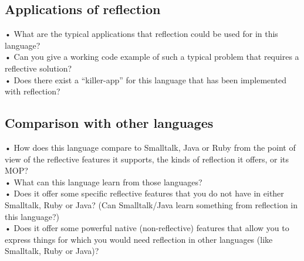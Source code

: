 \subsection{Applications of reflection}
•	What are the typical applications that reflection could be used for in this language?\\
•	Can you give a working code example of such a typical problem that requires a reflective solution?\\
•	Does there exist a “killer-app” for this language that has been implemented with reflection?\\

\subsection{Comparison with other languages}
•	How does this language compare to Smalltalk, Java or Ruby from the point of view of the reflective features it supports, the kinds of reflection it offers, or its MOP?\\
•	What can this language learn from those languages?\\
•	Does it offer some specific reflective features that you do not have in either Smalltalk, Ruby or Java? (Can Smalltalk/Java learn something from reflection in this language?)\\
•	Does it offer some powerful native (non-reflective) features that allow you to express things for which you would need reflection in other languages (like Smalltalk, Ruby or Java)?\\
